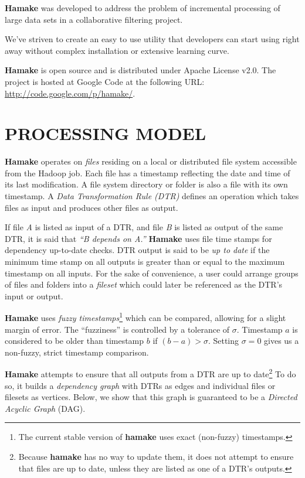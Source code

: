 \documentclass[a4paper,twoside]{article}
\begin{document}
\textbf{Hamake} was developed to address the problem of incremental
processing of large data sets in a collaborative filtering project.

We've striven to create an easy to use utility that developers can
start using right away without complex installation or extensive
learning curve. 

\textbf{Hamake} is open source and is distributed under Apache
License v2.0. The project is hosted at Google Code at the following
URL: \url{http://code.google.com/p/hamake/}.

\section{\uppercase{Processing Model}}

\textbf{Hamake} operates on \textit{files} residing on a local or
distributed file system accessible from the Hadoop job. Each file has a timestamp reflecting the date and time of its
last modification. A file system directory or folder is also a file
with its own timestamp. A \textit{Data Transformation Rule (DTR)}
defines an operation which takes files as input and produces other
files as output.

If file \textit{A} is listed as input of a DTR, and file \textit{B}
is listed as output of the same DTR, it is said that \textit{``B depends
  on A.''} \textbf{Hamake} uses file time stamps for dependency
up-to-date checks. DTR output is said to be \textit{up to date} if the minimum time stamp on all outputs is greater than or equal to the maximum timestamp on all inputs. For the sake of convenience, a user could arrange groups of files and folders into a \emph{fileset} which could later be referenced as the DTR's input or output.

\textbf{Hamake} uses \textit{fuzzy timestamps}\footnote{The current stable
  version of \textbf{hamake} uses exact (non-fuzzy) timestamps.}
which can be compared, allowing for a slight margin of error. The
``fuzziness'' is controlled by a tolerance of $\sigma$. Timestamp $a$ is considered to be older than timestamp $b$ if $(b-a)>\sigma$. Setting $\sigma=0$ gives us a non-fuzzy, strict timestamp comparison.

\textbf{Hamake} attempts to ensure that all outputs from a DTR are up to
date\footnote{Because \textbf{hamake} has no way to update them, it does not attempt to ensure that files are up to date, unless they are listed as one of a DTR's outputs.} To do so, it builds a \textit{dependency graph} with DTRs as edges and individual files or filesets as vertices. Below, we show that this graph is guaranteed to be a \textit{Directed Acyclic Graph} (DAG).
\end{document}
